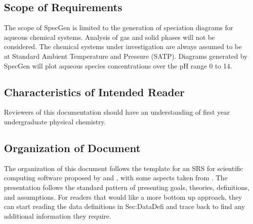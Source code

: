 \documentclass[12pt]{article}
\newcommand{\progname}{SpecGen} %
\begin{document}
\subsection{Scope of Requirements} 
 
The scope of \progname{} is limited to the generation of speciation diagrams
for aqueous chemical systems.  Analysis of gas and solid phases will not be
considered.  The chemical systems under investigation are always assumed to be
at Standard Ambient Temperature and Pressure (SATP).  Diagrams generated by 
\progname{} will plot aqueous species concentrations over the pH range 0 to
14.  

\subsection{Characteristics of Intended Reader} 
Reviewers of this documentation should have an understanding of first year 
undergraduate physical chemistry.


\subsection{Organization of Document}
The organization of this document follows the template for an SRS for scientific 
computing software proposed by \cite{SmithAndLai2005} and \cite{Koothoor2013}, 
with some aspects taken from \cite{RobertsonAndRobertson1999Vol}. The 
presentation follows the standard pattern of presenting goals, theories, 
definitions, and assumptions. For readers that would like a more bottom up 
approach, they can start reading the data definitions in Sec:DataDefi and trace 
back to find any additional information they require.
\end{document}
